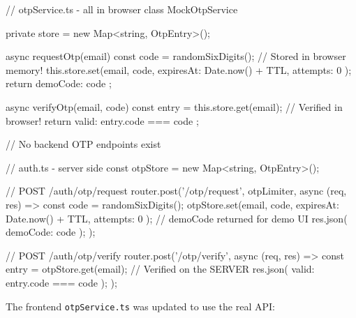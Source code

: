 \documentclass[12pt,a4paper]{report}
\newcommand{\diffL}{\noindent\begin{minipage}[t]{0.485\linewidth}}
\newcommand{\diffR}{\end{minipage}\hfill\begin{minipage}[t]{0.485\linewidth}}
\newcommand{\diffend}{\end{minipage}\par\smallskip}
\begin{document}
	\diffL
	\begin{beforecode}
		// otpService.ts - all in browser
		class MockOtpService {
			private store =
			new Map<string, OtpEntry>();
			
			async requestOtp(email) {
				const code = randomSixDigits();
				// Stored in browser memory!
				this.store.set(email, {
					code,
					expiresAt: Date.now() + TTL,
					attempts: 0
				});
				return { demoCode: code };
			}
			
			async verifyOtp(email, code) {
				const entry = this.store.get(email);
				// Verified in browser!
				return {
					valid: entry.code === code
				};
			}
		}
		// No backend OTP endpoints exist
	\end{beforecode}
	\diffR
	\begin{aftercode}
		// auth.ts - server side
		const otpStore =
		new Map<string, OtpEntry>();
		
		// POST /auth/otp/request
		router.post('/otp/request',
		otpLimiter,
		async (req, res) => {
			const code = randomSixDigits();
			otpStore.set(email, {
				code,
				expiresAt: Date.now() + TTL,
				attempts: 0
			});
			// demoCode returned for demo UI
			res.json({ demoCode: code });
		});
		
		// POST /auth/otp/verify
		router.post('/otp/verify',
		async (req, res) => {
			const entry = otpStore.get(email);
			// Verified on the SERVER
			res.json({
				valid: entry.code === code
			});
		});
	\end{aftercode}
	\diffend
	
	\noindent The frontend \texttt{otpService.ts} was updated to use the real API:
	
	
\end{document}
